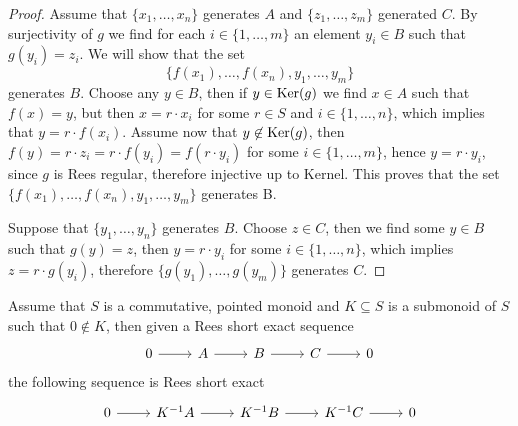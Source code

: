 \begin{proof}
    Assume that $\{x_1,\dots,x_n\}$ generates $A$ and $\{z_1,\dots,z_m\}$ generated $C$. By surjectivity of $g$ we find 
    for each $i\in\{1,\dots,m\}$ an element $y_i\in B$ such that $g(y_i)=z_i$. We will show that the set 
    \[
        \{f(x_1),\dots,f(x_n),y_1,\dots,y_m\}
    \]
    generates $B$. Choose any $y\in B$, then if $y\in\mathrm{Ker}(g)$ we find $x\in A$ such that $f(x)=y$, but then 
    $x=r\cdot x_i$ for some $r\in S$ and $i\in\{1,\dots,n\}$, which implies that $y=r\cdot f(x_i)$. Assume now that $y\not\in\mathrm{Ker}(g)$,
    then $f(y) = r\cdot z_i = r\cdot f(y_i) = f(r\cdot y_i)$ for some $i\in\{1,\dots,m\}$, hence $y=r\cdot y_i$, since $g$ is Rees regular, therefore 
    injective up to Kernel. This proves that the set $\{f(x_1),\dots,f(x_n),y_1,\dots,y_m\}$ generates B. \par 
    Suppose that $\{y_1,\dots,y_n\}$ generates $B$. Choose $z\in C$, then we find some $y\in B$ such that $g(y)=z$, then 
    $y=r\cdot y_i$ for some $i\in\{1,\dots,n\}$, which implies $z=r\cdot g(y_i)$, therefore $\{g(y_1),\dots,g(y_m)\}$ generates $C$.
\end{proof}
\begin{proposition}
    Assume that $S$ is a commutative, pointed monoid and $K\subseteq S$ is a submonoid of $S$ such that $0\not\in K$, then
    given a Rees short exact sequence 
    \[\begin{tikzcd}
        0 & A & B & C & 0
        \arrow[from=1-1, to=1-2]
        \arrow[from=1-2, to=1-3]
        \arrow[from=1-3, to=1-4]
        \arrow[from=1-4, to=1-5]
    \end{tikzcd}\]
    the following sequence is Rees short exact
    \[\begin{tikzcd}
        0 & {K^{-1}A} & {K^{-1}B} & {K^{-1}C} & 0
        \arrow[from=1-1, to=1-2]
        \arrow[from=1-2, to=1-3]
        \arrow[from=1-3, to=1-4]
        \arrow[from=1-4, to=1-5]
    \end{tikzcd}\]
\end{proposition}
